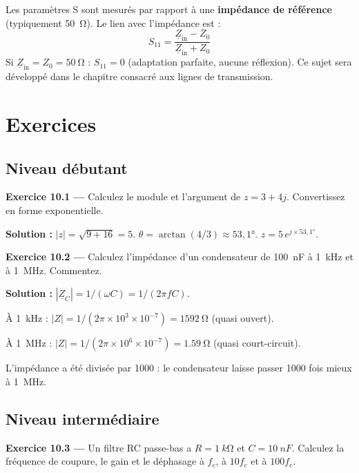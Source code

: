 \documentclass[12pt,a4paper,twoside]{book}
\begin{document}
\begin{attention}
Les paramètres S sont mesurés par rapport à une \textbf{impédance de référence} (typiquement \SI{50}{\ohm}). Le lien avec l'impédance est :
\[
S_{11} = \frac{\underline{Z}_{\text{in}} - Z_0}{\underline{Z}_{\text{in}} + Z_0}
\]
Si $\underline{Z}_{\text{in}} = Z_0 = \SI{50}{\ohm}$ : $S_{11} = 0$ (adaptation parfaite, aucune réflexion). Ce sujet sera développé dans le chapitre consacré aux lignes de transmission.
\end{attention}

\section*{Exercices}

\subsection*{Niveau débutant}

\textbf{Exercice 10.1 ---} Calculez le module et l'argument de $z = 3 + 4j$. Convertissez en forme exponentielle.

\begin{pratique}
\textbf{Solution :} $|z| = \sqrt{9+16} = 5$. $\theta = \arctan(4/3) \approx 53{,}1°$. $z = 5\,e^{j\times53{,}1°}$.
\end{pratique}

\textbf{Exercice 10.2 ---} Calculez l'impédance d'un condensateur de \SI{100}{nF} à \SI{1}{kHz} et à \SI{1}{MHz}. Commentez.

\begin{pratique}
\textbf{Solution :} $|\underline{Z}_C| = 1/(\omega C) = 1/(2\pi f C)$.

À \SI{1}{kHz} : $|Z| = 1/(2\pi\times10^3\times10^{-7}) = \SI{1592}{\ohm}$ (quasi ouvert).

À \SI{1}{MHz} : $|Z| = 1/(2\pi\times10^6\times10^{-7}) = \SI{1.59}{\ohm}$ (quasi court-circuit).

L'impédance a été divisée par 1000 : le condensateur laisse passer 1000 fois mieux à \SI{1}{MHz}.
\end{pratique}

\subsection*{Niveau intermédiaire}

\textbf{Exercice 10.3 ---} Un filtre RC passe-bas a $R = \SI{1}{k\ohm}$ et $C = \SI{10}{nF}$. Calculez la fréquence de coupure, le gain et le déphasage à $f_c$, à $10f_c$ et à $100f_c$.
\end{document}
